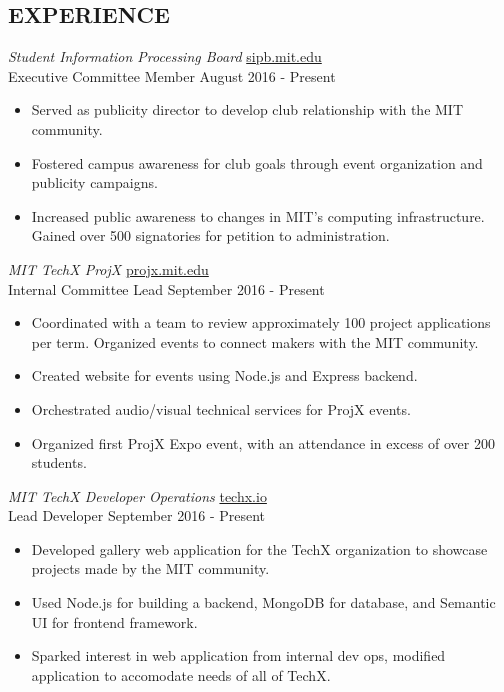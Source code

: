 \documentclass{res}
\begin{document}
\begin{resume}
\section{EXPERIENCE} 
  {\sl Student Information Processing Board}                 \hfill  \uline{sipb.mit.edu} \\
  Executive Committee Member                                 \hfill  August 2016 - Present
    \begin{itemize}  %
      \item Served as publicity director to develop club relationship with the MIT community.
      \item Fostered campus awareness for club goals through event organization and publicity campaigns.
      \item Increased public awareness to changes in MIT's computing infrastructure. Gained over 500 signatories for petition to administration.
    \end{itemize}
  {\sl MIT TechX ProjX}                                      \hfill  \uline{projx.mit.edu} \\
  Internal Committee Lead                                    \hfill  September 2016 - Present 
    \begin{itemize}  %
      \item Coordinated with a team to review approximately 100 project applications per term. Organized events to connect makers with the MIT community.
      \item Created website for events using Node.js and Express backend.
      \item Orchestrated audio/visual technical services for ProjX events.
      \item Organized first ProjX Expo event, with an attendance in excess of over 200 students.
    \end{itemize}
  {\sl MIT TechX Developer Operations}                       \hfill  \uline{techx.io} \\
  Lead Developer                                             \hfill  September 2016 - Present 
    \begin{itemize}  %
      \item Developed gallery web application for the TechX organization to showcase projects made by the MIT community. 
      \item Used Node.js for building a backend, MongoDB for database, and Semantic UI for frontend framework.
      \item Sparked interest in web application from internal dev ops, modified application to accomodate needs of all of TechX.

\end{itemize}
\end{resume}
\end{document}
